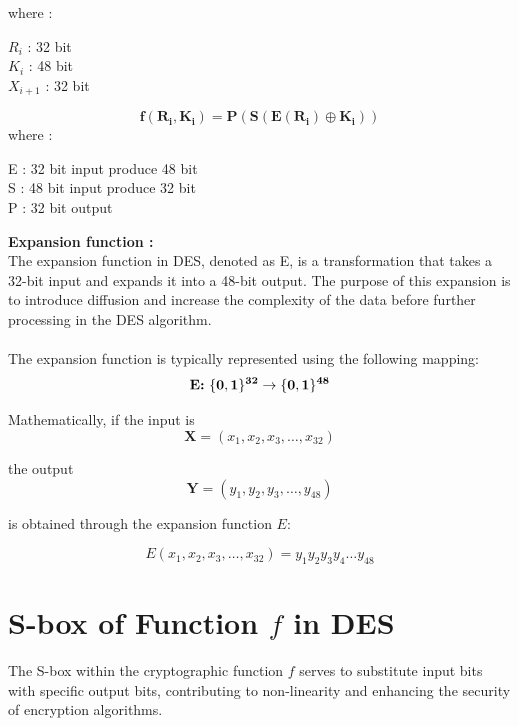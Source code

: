 \documentclass[11pt]{article}
\begin{document}
where :
\begin{itemize}
    $R_i$ : 32 bit\\
     $K_i$ : 48 bit\\
     $X_{i+1}$ : 32 bit\\
\end{itemize}

\begin{equation}
\boldsymbol{f}(\boldsymbol{R_i}, \boldsymbol{K_i}) = \boldsymbol{P}(\boldsymbol{S}(\boldsymbol{E}(\boldsymbol{R_i}) \oplus \boldsymbol{K_i}))
\end{equation}
where :
\begin{itemize}
     E : 32 bit input produce 48 bit\\
     S : 48 bit input produce 32 bit\\
     P : 32 bit output\\
\end{itemize}
\textbf{Expansion function : }
\\
The expansion function in DES, denoted as E, is a transformation that takes a 32-bit input and expands it into a 48-bit output. The purpose of this expansion is to introduce diffusion and increase the complexity of the data before further processing in the DES algorithm.\\
\\
The expansion function is typically represented using the following mapping:\\
\begin{equation}
    \text{\textbf{E:} } \mathbf{\{ 0, 1 \}^{32} \rightarrow \{ 0, 1 \}^{48}}
    
\end{equation}

Mathematically, if the input is
\[ \mathbf{X} = (x_1, x_2, x_3, \ldots, x_{32}) \]

the output
\[ \mathbf{Y} = (y_1, y_2, y_3, \ldots, y_{48}) \]

is obtained through the expansion function \(E\):

\[ E(x_1, x_2, x_3, \ldots, x_{32}) = y_1y_2y_3y_4 \ldots y_{48} \]



\section{S-box of Function \(f\) in DES}

The S-box within the cryptographic function \(f\) serves to substitute input bits with specific output bits, contributing to non-linearity and enhancing the security of encryption algorithms.\\
\end{document}
